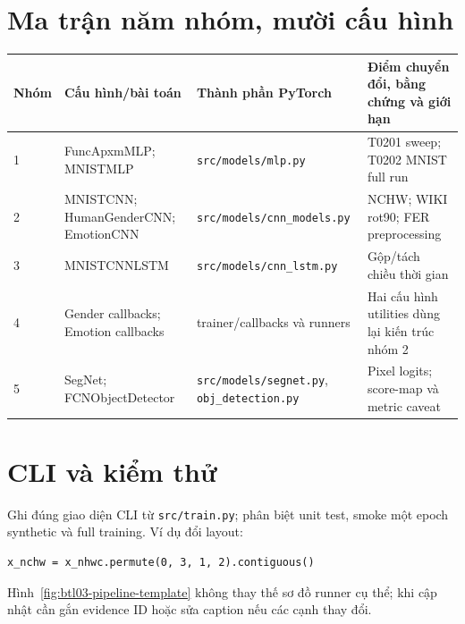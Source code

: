 \section{Ma trận năm nhóm, mười cấu hình}
\begin{longtable}{p{}p{}p{}p{}}
\toprule Nhóm & Cấu hình/bài toán & Thành phần PyTorch & Điểm chuyển đổi, bằng chứng và giới hạn \\
\midrule
1 & FuncApxmMLP; MNISTMLP & \texttt{src/models/mlp.py} & T0201 sweep; T0202 MNIST full run \\
2 & MNISTCNN; HumanGenderCNN; EmotionCNN & \texttt{src/models/cnn\_models.py} & NCHW; WIKI rot90; FER preprocessing \\
3 & MNISTCNNLSTM & \texttt{src/models/cnn\_lstm.py} & Gộp/tách chiều thời gian \\
4 & Gender callbacks; Emotion callbacks & trainer/callbacks và runners & Hai cấu hình utilities dùng lại kiến trúc nhóm 2 \\
5 & SegNet; FCNObjectDetector & \texttt{src/models/segnet.py}, \texttt{obj\_detection.py} & Pixel logits; score-map và metric caveat \\
\bottomrule
\end{longtable}

\section{CLI và kiểm thử}
Ghi đúng giao diện CLI từ \texttt{src/train.py}; phân biệt unit test, smoke một epoch synthetic và full training. Ví dụ đổi layout:
\begin{lstlisting}[style=python,caption={Đổi layout NHWC sang NCHW}]
x_nchw = x_nhwc.permute(0, 3, 1, 2).contiguous()
\end{lstlisting}
Hình~\ref{fig:btl03-pipeline-template} không thay thế sơ đồ runner cụ thể; khi cập nhật cần gắn evidence ID hoặc sửa caption nếu các cạnh thay đổi.
